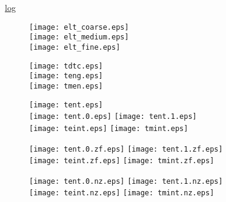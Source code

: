 \documentclass{article}
\begin{document}


\underline{log}\\


\newpage

\begin{figure}[!ht]
\texttt{[image: elt\_coarse.eps]}\\
\texttt{[image: elt\_medium.eps]}\\
\texttt{[image: elt\_fine.eps]}
\end{figure}

\begin{figure}[!ht]
\texttt{[image: tdtc.eps]}\\
\texttt{[image: teng.eps]}\\
\texttt{[image: tmen.eps]}
\end{figure}

\begin{figure}[!ht]
\texttt{[image: tent.eps]}\\
\texttt{[image: tent.0.eps]}
\texttt{[image: tent.1.eps]}\\
\texttt{[image: teint.eps]}
\texttt{[image: tmint.eps]}\\
\end{figure}

\begin{figure}[!ht]
\texttt{[image: tent.0.zf.eps]}
\texttt{[image: tent.1.zf.eps]}\\
\texttt{[image: teint.zf.eps]}
\texttt{[image: tmint.zf.eps]}\\
\end{figure}

\begin{figure}[!ht]
\texttt{[image: tent.0.nz.eps]}
\texttt{[image: tent.1.nz.eps]}\\
\texttt{[image: teint.nz.eps]}
\texttt{[image: tmint.nz.eps]}\\
\end{figure}
\end{document}

